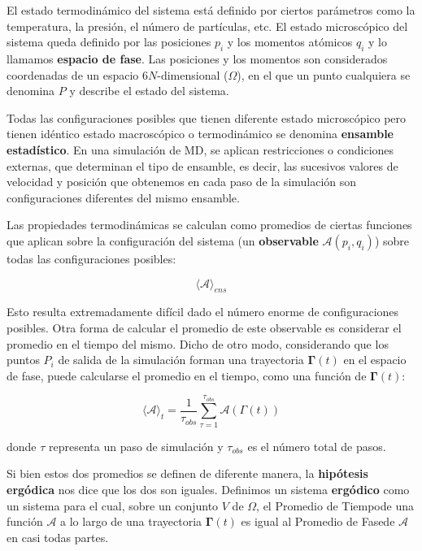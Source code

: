 El estado termodinámico del sistema está definido por ciertos parámetros como la temperatura, la presión, el número de partículas, etc. El estado microscópico del sistema queda definido por las posiciones $p_{i}$ y los momentos atómicos $q_{i}$ y lo llamamos \textbf{espacio de fase}. Las posiciones y los momentos son considerados coordenadas de un espacio $6N$-dimensional ($\Omega$), en el que un punto cualquiera se denomina $P$ y describe el estado del sistema. 

Todas las configuraciones posibles que tienen diferente estado microscópico pero tienen idéntico estado macroscópico o termodinámico se denomina \textbf{ensamble estadístico}. En una simulación de MD, se aplican restricciones o condiciones externas, que determinan el tipo de ensamble, es decir, las sucesivos valores de velocidad y posición que obtenemos en cada paso de la simulación son configuraciones diferentes del mismo ensamble.

Las propiedades termodinámicas se calculan como promedios de ciertas funciones que aplican sobre la configuración del sistema (un \textbf{observable} $\mathbf{\mathcal{A}}(p_{i},q_{i})$) sobre todas las configuraciones posibles:

\begin{equation}
\langle \mathbf{\mathcal{A}} \rangle _{ens}
\end{equation}

Esto resulta extremadamente difícil dado el número enorme de configuraciones posibles. Otra forma de calcular el promedio de este observable es considerar el promedio en el tiempo del mismo. Dicho de otro modo, considerando que los puntos $P_{i}$ de salida de la simulación forman una trayectoria $\mathbf{\Gamma}(t)$ en el espacio de fase, puede calcularse el promedio en el tiempo, como una función de $\mathbf{\Gamma}(t)$:

\begin{equation}
\langle \mathbf{\mathcal{A}} \rangle _{t} = \frac{1}{\tau_{obs}} \sum_{\tau = 1}^{\tau_{obs}} \mathbf{\mathcal{A}}(\Gamma (t))
\end{equation}

donde $\tau$ representa un paso de simulación y $\tau_{obs}$ es el número total de pasos.

Si bien estos dos promedios se definen de diferente manera, la \textbf{hipótesis ergódica} nos dice que los dos son iguales. Definimos un sistema \textbf{ergódico} como un sistema para el cual, sobre un conjunto $V$ de $\Omega$, el Promedio de Tiempo\footnotemark[1] de una función $\mathbf{\mathcal{A}}$ a lo largo de una trayectoria $\mathbf{\Gamma}(t)$ es igual al Promedio de Fase\footnotemark[2] de $\mathbf{\mathcal{A}}$ en casi todas partes\footnotemark[3].

